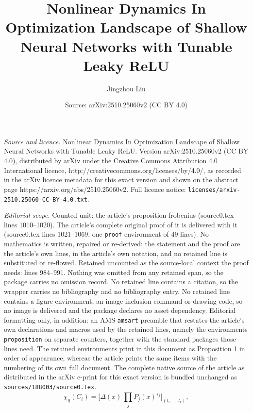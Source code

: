 \documentclass[10pt,a4paper]{amsart}
\title{Nonlinear Dynamics In Optimization Landscape of Shallow Neural Networks with Tunable Leaky ReLU}
\author{Jingzhou Liu}
\date{Source: arXiv:2510.25060v2 (CC BY 4.0)}
\begin{document}
\maketitle

\noindent\emph{Source and licence.} Nonlinear Dynamics In Optimization Landscape of Shallow Neural Networks with Tunable Leaky ReLU. Version arXiv:2510.25060v2 (CC BY 4.0), distributed by arXiv under the Creative Commons Attribution 4.0 International licence, http://creativecommons.org/licenses/by/4.0/, as recorded in the arXiv licence metadata for this exact version and shown on the abstract page https://arxiv.org/abs/2510.25060v2. Full licence notice: \texttt{licenses/arxiv-2510.25060-CC-BY-4.0.txt}.\par\smallskip

\noindent\textit{Editorial scope.} Counted unit: the article's proposition frobenius (source0.tex lines 1010--1020). The article's complete original proof of it is delivered with it (source0.tex lines 1021--1069, one \texttt{proof} environment of 49 lines). No mathematics is written, repaired or re-derived: the statement and the proof are the article's own lines, in the article's own notation, and no retained line is substituted or re-flowed.  Retained uncounted as the source-local context the proof needs: lines 984--991.  Nothing was omitted from any retained span, so the package carries no omission record.  No retained line contains a citation, so the wrapper carries no bibliography and no bibliography entry.  No retained line contains a figure environment, an image-inclusion command or drawing code, so no image is delivered and the package declares no asset dependency.  Editorial formatting only, in addition: an AMS \texttt{amsart} preamble that restates the article's own declarations and macros used by the retained lines, namely the environments \texttt{proposition} on separate counters, together with the standard packages those lines need.  The retained environments print in this document as Proposition 1 in order of appearance, whereas the article prints the same items with the numbering of its own full document.  The complete native source of the article as distributed in the arXiv e-print for this exact version is bundled unchanged as \texttt{sources/188003/source0.tex}.
\begin{equation}\label{eq:frobenius}
\chi_\eta(C_i)
= 
\bigl[
\Delta(x)\,
\prod_{j} P_j(x)^{\,i_j}
\bigr]_{(l_1,\dots,l_r)},
\end{equation}
\end{document}
